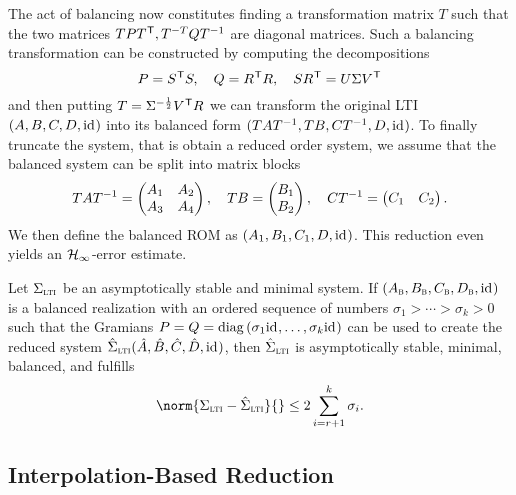 The act of balancing now constitutes finding a transformation matrix $T$ such that the two matrices $T P T\trans, T\inv[T] Q T\inv$ are diagonal matrices.
Such a balancing transformation can be constructed by computing the decompositions
\begin{equation}\label{eq:balancing}
    P = S\trans S,\quad Q = R\trans R,\quad S R\trans = U \Sigma V\trans
\end{equation}
and then putting $T = \Sigma\inv[\frac{1}{2}] V\trans R$ we can transform the original \ac{LTI} $(A, B, C, D, \id)$ into its balanced form $(T A T\inv, T B, C T\inv, D, \id)$.
To finally truncate the system, that is obtain a reduced order system, we assume that the balanced system can be split into matrix blocks
\begin{equation*}
    T A T\inv = \begin{pmatrix}
        A_1 & A_2 \\
        A_3 & A_4
    \end{pmatrix},\quad T B = \begin{pmatrix}
        B_1 \\
        B_2
    \end{pmatrix},\quad C T\inv = \begin{pmatrix}
        C_1 & C_2
    \end{pmatrix}.
\end{equation*}
We then define the balanced \ac{ROM} as $(A_1, B_1, C_1, D, \id)$.
This reduction even yields an $\mcl{H}_\infty$-error estimate.

\begin{theorem}[{Cf.~\cite[Theorem~6.4]{BB2017}}]\label{thm:h-inf-error}
    Let $\Sigma_{\msc{lti}}$ be an asymptotically stable and minimal system.
    If $(A_{\msc{b}}, B_{\msc{b}}, C_{\msc{b}}, D_{\msc{b}}, \id)$ is a balanced realization with an ordered sequence of numbers $\sigma_1 > \cdots > \sigma_k > 0$ such that the Gramians $P = Q = \diag{\sigma_1 \id, \dots, \sigma_k \id}$ can be used to create the reduced system $\hat{\Sigma}_{\msc{lti}} (\hat{A}, \hat{B}, \hat{C}, \hat{D}, \id)$, then $\hat{\Sigma}_{\msc{lti}}$ is asymptotically stable, minimal, balanced, and fulfills
    \begin{equation*}
        \norm{\Sigma_{\msc{lti}} - \hat{\Sigma}_{\msc{lti}}}{} \leq 2 \sum\limits_{i = r + 1}^k \sigma_i.
    \end{equation*}
\end{theorem}

\subsection{Interpolation-Based Reduction}\label{subsec:interpolation-reduction}

